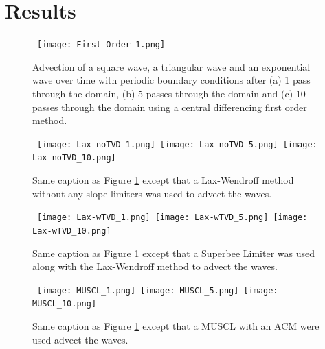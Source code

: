 \section{Results}
\label{results}
\begin{figure}[htbp]
\begin{center}
\mbox{
\texttt{[image: First\_Order\_1.png]}
} 
\mbox{  
}
\caption{Advection of a square wave, a triangular wave and an exponential wave over time with periodic boundary conditions after (a) 1 pass through the domain, (b) 5 passes through the domain and (c) 10 passes through the domain using a central differencing first order method.}
\label{First_Order}
\end{center}
\end{figure}

\begin{figure}[htbp]
\begin{center}
\mbox{
\texttt{[image: Lax-noTVD\_1.png]}
\texttt{[image: Lax-noTVD\_5.png]}
\texttt{[image: Lax-noTVD\_10.png]}
} 
\mbox{  
}
\caption{Same caption as Figure \ref{First_Order} except that a Lax-Wendroff method without any slope limiters was used to advect the waves.}
\label{Lax-noTVD}
\end{center}
\end{figure}

\begin{figure}[htbp]
\begin{center}
\mbox{
\texttt{[image: Lax-wTVD\_1.png]}
\texttt{[image: Lax-wTVD\_5.png]}
\texttt{[image: Lax-wTVD\_10.png]}
} 
\mbox{  
}
\caption{Same caption as Figure \ref{First_Order} except that a Superbee Limiter was used along with the Lax-Wendroff method to advect the waves.}
\label{Lax-wTVD}
\end{center}
\end{figure}

\begin{figure}[htbp]
\begin{center}
\mbox{
\texttt{[image: MUSCL\_1.png]}
\texttt{[image: MUSCL\_5.png]}
\texttt{[image: MUSCL\_10.png]}
} 
\mbox{  
}
\caption{Same caption as Figure \ref{First_Order} except that a MUSCL with an ACM were used advect the waves.}
\label{fig:MUSCL}
\end{center}
\end{figure}


